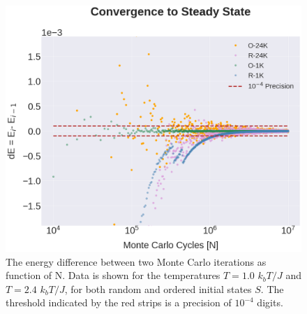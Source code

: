 \documentclass[%
reprint,nofootinbib,
amsmath,amssymb,
aps,
]{revtex4-1}
\begin{document}
\begin{figure}[H]
	\includegraphics[width = \columnwidth]{Figures/Plot3.png} 
	\caption{\label{4C3} The energy difference between two Monte Carlo iterations as function of N. Data is shown for the temperatures $T = 1.0$ $k_bT/J$ and $T = 2.4$ $k_bT/J$, for both random and ordered initial states $S$. The threshold indicated by the red strips is a precision of $10^{-4}$ digits.}
\end{figure}  \newpage 
\end{document}

